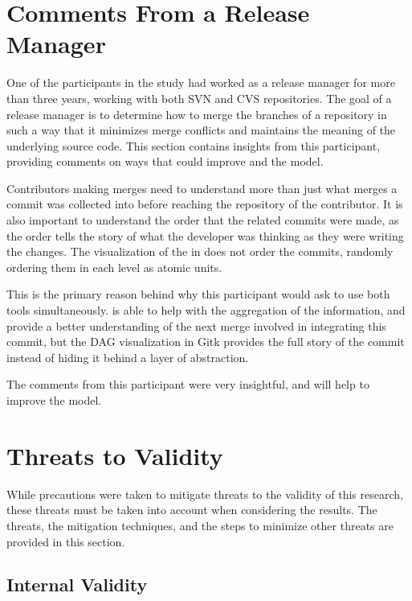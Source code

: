\section{Comments From a Release Manager}\label{sec:comments_from_a_release_manager}

One of the participants in the study had worked as a release manager for
more than three years, working with both SVN and CVS repositories. The
goal of a release manager is to determine how to merge the branches of a
repository in such a way that it minimizes merge conflicts and maintains
the meaning of the underlying source code. This section contains
insights from this participant, providing comments on ways that could
improve \tool{} and the \mt{} model.

Contributors making merges need to understand more than just what merges
a commit was collected into before reaching the repository of the
contributor.
It is also important to understand the order that the
related commits were made, as the order tells the story of what the
developer was thinking as they were writing the changes.
The visualization of the \mt{} in \tool{} does not order the commits,
randomly ordering them in each level as atomic units.

This is the primary reason behind why this participant would ask to use
both tools simultaneously. \tool{} is able to help with the aggregation
of the information, and provide a better understanding of the next merge
involved in integrating this commit, but the DAG visualization in Gitk
provides the full story of the commit instead of hiding it behind a
layer of abstraction.

The comments from this participant were very insightful, and will help
to improve the \mt{} model.

\section{Threats to Validity}\label{sec:threats_to_validity}

While precautions were taken to mitigate threats to the validity of this
research, these threats must be taken into account when considering the results.
The threats, the mitigation techniques, and the steps to minimize
other threats are provided in this section.

\subsection{Internal Validity}\label{sub:internal_validity}

